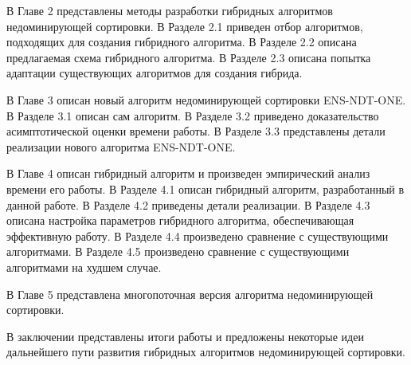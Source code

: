 В Главе 2 представлены методы разработки гибридных алгоритмов недоминирующей сортировки.
В Разделе 2.1 приведен отбор алгоритмов, подходящих для создания гибридного алгоритма.
В Разделе 2.2 описана предлагаемая схема гибридного алгоритма.
В Разделе 2.3 описана попытка адаптации существующих алгоритмов для создания гибрида. 

В Главе 3 описан новый алгоритм недоминирующей сортировки ENS-NDT-ONE.
В Разделе 3.1 описан сам алгоритм. 
В Разделе 3.2 приведено доказательство асимптотической оценки времени работы.
В Разделе 3.3 представлены детали реализации нового алгоритма ENS-NDT-ONE.

В Главе 4 описан гибридный алгоритм и произведен эмпирический анализ времени его работы.
В Разделе 4.1 описан гибридный алгоритм, разработанный в данной работе.
В Разделе 4.2 приведены детали реализации.
В Разделе 4.3 описана настройка параметров гибридного алгоритма, обеспечивающая эффективную работу. 
В Разделе 4.4 произведено сравнение с существующими алгоритмами.
В Разделе 4.5 произведено сравнение с существующими алгоритмами на худшем случае.

В Главе 5 представлена многопоточная версия алгоритма недоминирующей сортировки.

В заключении представлены итоги работы и предложены некоторые идеи дальнейшего пути развития гибридных алгоритмов недоминирующей сортировки.